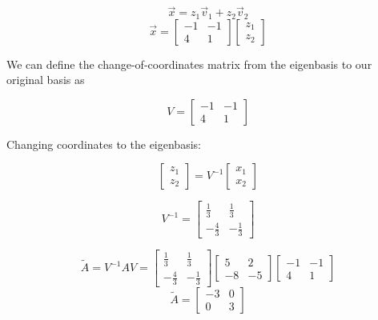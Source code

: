\begin{enumerate}
{\begin{centering}
\begin{tikzpicture}
	\end{tikzpicture}
\end{centering}

$$\vec x = z_1 \vec v_{1} + z_2 \vec v_{2}$$
$$\vec x =\begin{bmatrix} -1 & -1 \\ 4 & 1\end{bmatrix}\begin{bmatrix}z_{1} \\ z_{2}\end{bmatrix}$$

We can define the change-of-coordinates matrix from the eigenbasis to our original basis as 

$$V=\begin{bmatrix} -1 & -1 \\ 4 & 1\end{bmatrix}$$

Changing coordinates to the eigenbasis:

$$\begin{bmatrix}z_{1} \\ z_{2}\end{bmatrix} = V^{-1}\begin{bmatrix} x_1 \\ x_2\end{bmatrix}   $$

$$V^{-1}=\begin{bmatrix}\frac{1}{3} & \frac{1}{3} \\ -\frac{4}{3} & -\frac{1}{3}\end{bmatrix}$$

$$\widetilde{A} = V^{-1} A V = \begin{bmatrix}\frac{1}{3} & \frac{1}{3} \\ -\frac{4}{3} & -\frac{1}{3}\end{bmatrix}\begin{bmatrix}5 & 2 \\ -8 & -5\end{bmatrix}\begin{bmatrix} -1 & -1 \\ 4 & 1\end{bmatrix}$$
$$\widetilde{A} = \begin{bmatrix}-3 & 0 \\ 0 & 3\end{bmatrix}$$

}
\end{enumerate}
